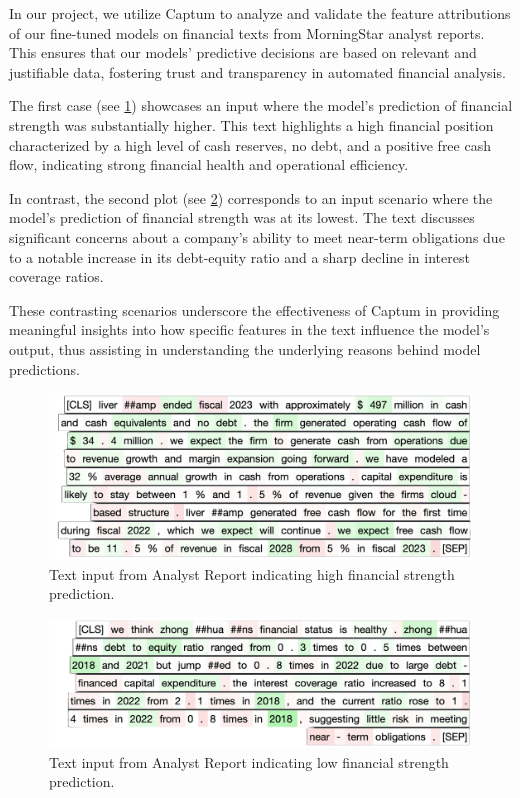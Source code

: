 \documentclass[conference]{IEEEtran}
\begin{document}
In our project, we utilize Captum to analyze and validate the feature attributions of our fine-tuned models on financial texts from MorningStar analyst reports. This ensures that our models' predictive decisions are based on relevant and justifiable data, fostering trust and transparency in automated financial analysis.

The first case (see \ref{fig:high1}) showcases an input where the model's prediction of financial strength was substantially higher. This text highlights a high financial position characterized by a high level of cash reserves, no debt, and a positive free cash flow, indicating strong financial health and operational efficiency.

In contrast, the second plot (see \ref{fig:low3}) corresponds to an input scenario where the model's prediction of financial strength was at its lowest. The text discusses significant concerns about a company's ability to meet near-term obligations due to a notable increase in its debt-equity ratio and a sharp decline in interest coverage ratios.

These contrasting scenarios underscore the effectiveness of Captum in providing meaningful insights into how specific features in the text influence the model's output, thus assisting in understanding the underlying reasons behind model predictions.


\begin{figure}[!h]
    \centering
    \includegraphics[width=.85\linewidth]{pictures/high_1.png}
    \caption{Text input from Analyst Report indicating high financial strength prediction.}
    \label{fig:high1}
\end{figure}

\begin{figure}[!h]
    \centering
    \includegraphics[width=.85\linewidth]{pictures/low_3.png}
    \caption{Text input from Analyst Report indicating low financial strength prediction.}
    \label{fig:low3}
\end{figure}
\end{document}
